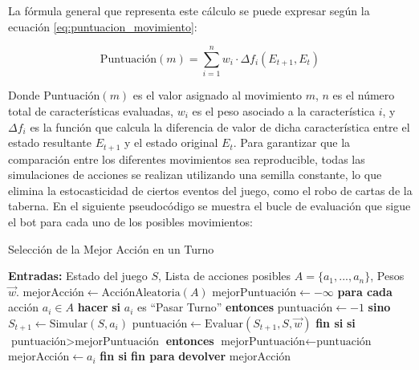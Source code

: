 La fórmula general que representa este cálculo se puede expresar según la ecuación \ref{eq:puntuacion_movimiento}:

\begin{equation}
\text{Puntuación}(m) = \sum_{i=1}^{n} w_i \cdot \Delta f_i(E_{t+1}, E_t) \label{eq:puntuacion_movimiento}
\end{equation}

Donde $\text{Puntuación}(m)$ es el valor asignado al movimiento $m$, $n$ es el número total de características evaluadas, $w_i$ es el peso asociado a la característica $i$, y $\Delta f_i$ es la función que calcula la diferencia de valor de dicha característica entre el estado resultante $E_{t+1}$ y el estado original $E_t$. Para garantizar que la comparación entre los diferentes movimientos sea reproducible, todas las simulaciones de acciones se realizan utilizando una semilla constante, lo que elimina la estocasticidad de ciertos eventos del juego, como el robo de cartas de la taberna. En el siguiente pseudocódigo se muestra el bucle de evaluación que sigue el bot para cada uno de los posibles movimientos:

\begin{algorithm}[H]
    \caption{Selección de la Mejor Acción en un Turno}
    \label{alg:get_best_move}
    \begin{algorithmic}[1]
        \State {}
        \State \textbf{Entradas:} Estado del juego $S$, Lista de acciones posibles $A = \{a_1, ..., a_n\}$, Pesos $\vec{w}$.
        \State
        \State $\text{mejorAcción} \leftarrow \text{AcciónAleatoria}(A)$
        \State $\text{mejorPuntuación} \leftarrow -\infty$
        \State
        \State \textbf{para cada} acción $a_i \in A$ \textbf{hacer}
        \State \quad \textbf{si} $a_i$ es ``Pasar Turno'' \textbf{entonces}
        \State \qquad $\text{puntuación} \leftarrow -1$
        \State \quad \textbf{sino}
        \State \qquad $S_{t+1} \leftarrow \text{Simular}(S, a_i)$
        \State \qquad $\text{puntuación} \leftarrow \text{Evaluar}(S_{t+1}, S, \vec{w})$ 
        \State \quad \textbf{fin si}
        \State
        \State \quad \textbf{si} $\text{puntuación} > \text{mejorPuntuación}$ \textbf{entonces}
        \State \qquad $\text{mejorPuntuación} \leftarrow \text{puntuación}$
        \State \qquad $\text{mejorAcción} \leftarrow a_i$
        \State \quad \textbf{fin si}
        \State \textbf{fin para}
        \State
        \State \textbf{devolver} $\text{mejorAcción}$
    \end{algorithmic}
\end{algorithm}


